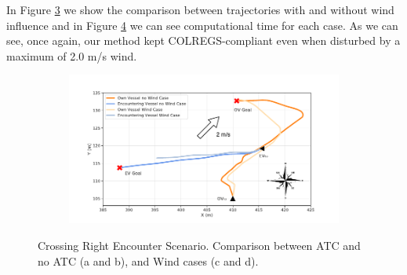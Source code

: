         In Figure \ref{fig:plot_cr_w_vs_wind} we show the comparison between trajectories with and without wind influence and in Figure \ref{fig:plot_cr_w_vs_wind_CT} we can see computational time for each case. As we can see, once again, our method kept COLREGS-compliant even when disturbed by a maximum of 2.0 m/s wind.
        
        \begin{figure}[H]
        \centering
        
            \begin{subfigure}[b]{0.49\textwidth}
                \centering
                
                \caption{}
                \label{fig:plot_cr_w_vs_wo}
            \end{subfigure}
            \begin{subfigure}[b]{0.49\textwidth}
                \centering
                
                \caption{}
                \label{fig:plot_cr_w_vs_wo_CT}
            \end{subfigure}
            
            \begin{subfigure}[b]{0.49\textwidth}
                \centering
                \includegraphics[width=\textwidth]{figs/Chap5/plot_cr_w_vs_wind.pdf}
                \caption{}
                \label{fig:plot_cr_w_vs_wind}
            \end{subfigure}
            \begin{subfigure}[b]{0.49\textwidth}
                \centering
                
                \caption{}
                \label{fig:plot_cr_w_vs_wind_CT}
            \end{subfigure}
        
        \caption{Crossing Right Encounter Scenario. Comparison between \ac{ATC} and no \ac{ATC} (a and b), and Wind cases (c and d).}
        \label{fig:plots_cr}
        \end{figure}
